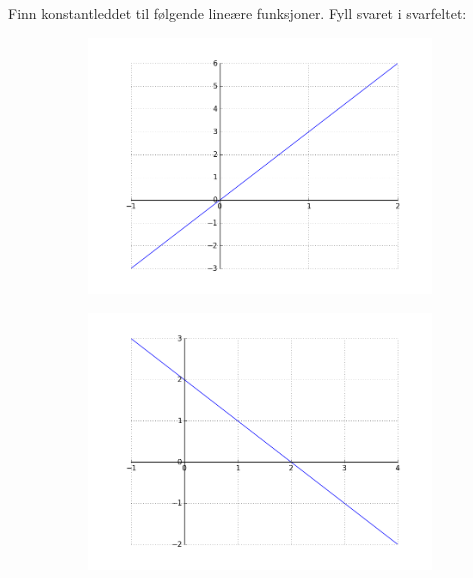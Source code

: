 \documentclass[12pt,twoside,onecolumn]{article}
\begin{document}
\begin{Exercise}
Finn konstantleddet til følgende lineære funksjoner. Fyll svaret i svarfeltet:
\begin{figure}[h!]
\centering
    \begin{subfigure}{.5\textwidth}
    \centering
    \includegraphics[scale = 0.5]{figures/3X.png}
    \end{subfigure}%
    \begin{subfigure}{.5\textwidth}
    \centering
    \includegraphics[scale = 0.5]{figures/mXp2.png}
    \end{subfigure}
    \begin{subfigure}{.5\textwidth}
    \centering

\end{subfigure}
\end{figure}
\end{Exercise}
\end{document}
